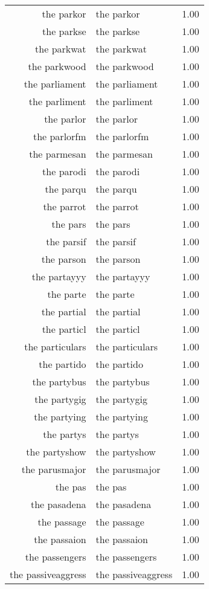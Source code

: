 \begin{table}[ht]
\begin{tabular}{rlr}
  the parkor & the parkor & 1.00 \\ 
  the parkse & the parkse & 1.00 \\ 
  the parkwat & the parkwat & 1.00 \\ 
  the parkwood & the parkwood & 1.00 \\ 
  the parliament & the parliament & 1.00 \\ 
  the parliment & the parliment & 1.00 \\ 
  the parlor & the parlor & 1.00 \\ 
  the parlorfm & the parlorfm & 1.00 \\ 
  the parmesan & the parmesan & 1.00 \\ 
  the parodi & the parodi & 1.00 \\ 
  the parqu & the parqu & 1.00 \\ 
  the parrot & the parrot & 1.00 \\ 
  the pars & the pars & 1.00 \\ 
  the parsif & the parsif & 1.00 \\ 
  the parson & the parson & 1.00 \\ 
  the partayyy & the partayyy & 1.00 \\ 
  the parte & the parte & 1.00 \\ 
  the partial & the partial & 1.00 \\ 
  the particl & the particl & 1.00 \\ 
  the particulars & the particulars & 1.00 \\ 
  the partido & the partido & 1.00 \\ 
  the partybus & the partybus & 1.00 \\ 
  the partygig & the partygig & 1.00 \\ 
  the partying & the partying & 1.00 \\ 
  the partys & the partys & 1.00 \\ 
  the partyshow & the partyshow & 1.00 \\ 
  the parusmajor & the parusmajor & 1.00 \\ 
  the pas & the pas & 1.00 \\ 
  the pasadena & the pasadena & 1.00 \\ 
  the passage & the passage & 1.00 \\ 
  the passaion & the passaion & 1.00 \\ 
  the passengers & the passengers & 1.00 \\ 
  the passiveaggress & the passiveaggress & 1.00 \\ 

\end{tabular}
\end{table}
